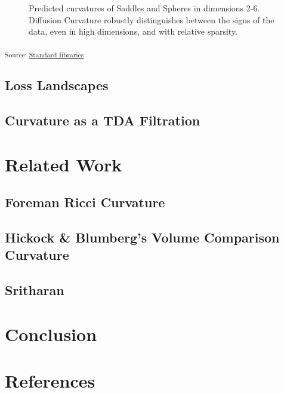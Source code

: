 \documentclass[
  letterpaper,
  DIV=11,
  numbers=noendperiod]{scrartcl}
\theoremstyle{plain}
\theoremstyle{plain}
\theoremstyle{definition}
\theoremstyle{plain}
\theoremstyle{definition}
\theoremstyle{plain}
\theoremstyle{remark}
\begin{document}
\begin{figure}[H]
{}

\caption{\label{fig-sadspheres}Predicted curvatures of Saddles and
Spheres in dimensions 2-6. Diffusion Curvature robustly distinguishes
between the signs of the data, even in high dimensions, and with
relative sparsity.}

\end{figure}%

\textsubscript{Source:
\href{https://professorwug.github.io/diffusion-curvature//Users/boreas/Pumberton/Workshop/21-SUMRY-Curvature/diffusion-curvature/nbs/5-sign-prediction-tests.ipynb.html\#cell-fig-sadspheres}{Standard
libraries}}

\subsection{Loss Landscapes}\label{loss-landscapes}

\subsection{Curvature as a TDA
Filtration}\label{curvature-as-a-tda-filtration}

\section{Related Work}\label{related-work}

\subsection{Foreman Ricci Curvature}\label{foreman-ricci-curvature}

\subsection{Hickock \& Blumberg's Volume Comparison
Curvature}\label{hickock-blumbergs-volume-comparison-curvature}

\subsection{Sritharan}\label{sritharan}

\section{Conclusion}\label{conclusion}

\section*{References}\label{references}
\end{document}
